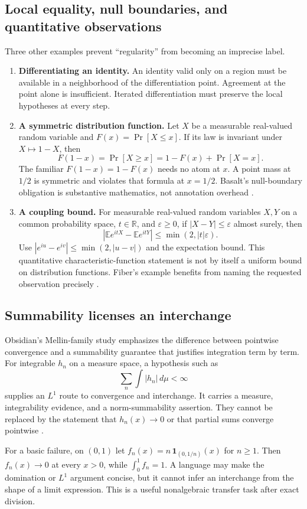 \documentclass[11pt,letterpaper]{article}
\newcommand{\R}{\mathbb R}\newcommand{\Q}{\mathbb Q}
\theoremstyle{definition}\newtheorem{definition}[proposition]{Definition}
\theoremstyle{remark}\newtheorem{remark}[proposition]{Remark}
\begin{document}
\subsection{Local equality, null boundaries, and quantitative observations}
Three other examples prevent ``regularity'' from becoming an imprecise label.
\begin{enumerate}
\item \textbf{Differentiating an identity.} An identity valid only on a region
must be available in a neighborhood of the differentiation point. Agreement
at the point alone is insufficient. Iterated differentiation must preserve
the local hypotheses at every step.
\item \textbf{A symmetric distribution function.} Let $X$ be a measurable
real-valued random variable and $F(x)=\Pr[X\le x]$. If its law is invariant
under $X\mapsto1-X$, then
\[
 F(1-x)=\Pr[X\ge x]=1-F(x)+\Pr[X=x].
\]
The familiar $F(1-x)=1-F(x)$ needs no atom at $x$. A point mass at $1/2$
is symmetric and violates that formula at $x=1/2$. Basalt's null-boundary
obligation is substantive mathematics, not annotation overhead \cite{basalt}.
\item \textbf{A coupling bound.} For measurable real-valued random variables
$X,Y$ on a common probability space, $t\in\R$, and $\varepsilon\ge0$, if
$|X-Y|\le\varepsilon$ almost surely, then
\[
 |\mathbb E e^{itX}-\mathbb E e^{itY}|
 \le\min(2,|t|\varepsilon).
\]
Use $|e^{iu}-e^{iv}|\le\min(2,|u-v|)$ and the expectation bound.
This quantitative characteristic-function statement is not by itself a
uniform bound on distribution functions. Fiber's example benefits from naming
the requested observation precisely \cite{fiber}.
\end{enumerate}

\subsection{Summability licenses an interchange}
Obsidian's Mellin-family study emphasizes the difference between pointwise
convergence and a summability guarantee that justifies integration term by
term. For integrable $h_n$ on a measure space, a hypothesis such as
\[
 \sum_n\int |h_n|\,d\mu<\infty
\]
supplies an $L^1$ route to convergence and interchange. It carries a measure,
integrability evidence, and a norm-summability assertion. They cannot be
replaced by the statement that $h_n(x)\to0$ or that partial sums converge
pointwise \cite{obsidian}.

For a basic failure, on $(0,1)$ let
$f_n(x)=n\,\mathbf1_{(0,1/n)}(x)$ for $n\ge1$. Then $f_n(x)\to0$ at every $x>0$, while
$\int_0^1 f_n=1$. A language may make the domination or $L^1$ argument concise,
but it cannot infer an interchange from the shape of a limit expression.
This is a useful nonalgebraic transfer task after exact division.
\end{document}
